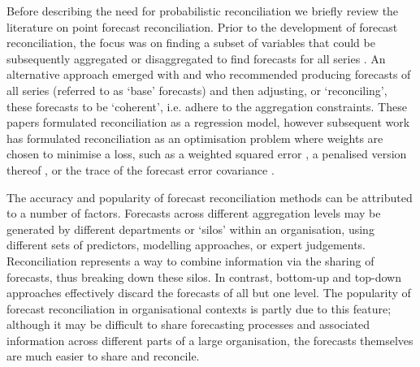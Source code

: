 \documentclass[a4paper,12pt]{article}
\theoremstyle{definition}
\begin{document}
Before describing the need for probabilistic reconciliation we briefly review the literature on point forecast reconciliation. Prior to the development of forecast reconciliation, the focus was on finding a subset of variables that could be subsequently aggregated or disaggregated to find forecasts for all series \citep[see][and references therein]{Dunn1976,Gross1990}. An alternative approach emerged with \cite{AthEtAl2009} and \cite{HynEtAl2011} who recommended producing forecasts of all series (referred to as `base' forecasts) and then adjusting, or `reconciling', these forecasts to be `coherent', i.e. adhere to the aggregation constraints. These papers formulated reconciliation as a regression model, however subsequent work has formulated reconciliation as an optimisation problem where weights are chosen to minimise a loss, such as a weighted squared error \citep{VanErven2015a,nystrup2020}, a penalised version thereof \citep{bentaiebkoo}, or the trace of the forecast error covariance \citep{WicEtAl2019}.

The accuracy and popularity of forecast reconciliation methods can be attributed to a number of factors. Forecasts across different aggregation levels may be generated by different departments or ‘silos’ within an organisation, using different sets of predictors, modelling approaches, or expert judgements. Reconciliation represents a way to combine information via the sharing of forecasts, thus breaking down these silos. In contrast, bottom-up and top-down approaches effectively discard the forecasts of all but one level. The popularity of forecast reconciliation in organisational contexts is partly due to this feature; although it may be difficult to share forecasting processes and associated information across different parts of a large organisation, the forecasts themselves are much easier to share and reconcile.
\end{document}
